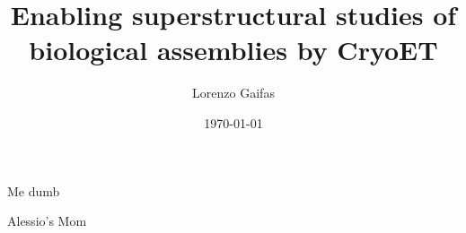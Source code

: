 \documentclass[12pt,a4paper]{book}
\newcommand{\blankpage}{\newpage\mbox{}\newpage}
\begin{document}

\frontmatter {}  %

    \title{Enabling superstructural studies of biological assemblies by CryoET}
    \author{Lorenzo Gaifas}
    \date{\today}

    \maketitle
    \addtocounter{page}{2}
    
    \blankpage
    \epigraph{Me dumb}{Alessio's Mom}

    
    
    \tableofcontents

\mainmatter
    
    

\backmatter
    \listoffigures
    
    
\end{document}
